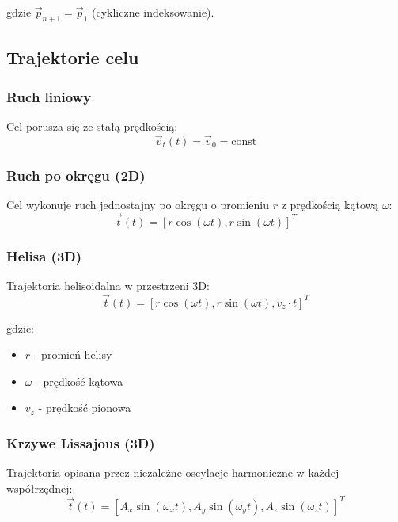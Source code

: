 \documentclass[12pt,a4paper]{article}
\begin{document}
gdzie $\vec{p}_{n+1} = \vec{p}_1$ (cykliczne indeksowanie).

\subsection{Trajektorie celu}

\subsubsection{Ruch liniowy}

Cel porusza się ze stałą prędkością:
\begin{equation}
\vec{v}_t(t) = \vec{v}_0 = \text{const}
\end{equation}

\subsubsection{Ruch po okręgu (2D)}

Cel wykonuje ruch jednostajny po okręgu o promieniu $r$ z prędkością kątową $\omega$:
\begin{equation}
\vec{t}(t) = [r\cos(\omega t), r\sin(\omega t)]^T
\end{equation}

\subsubsection{Helisa (3D)}

Trajektoria helisoidalna w przestrzeni 3D:
\begin{equation}
\vec{t}(t) = [r\cos(\omega t), r\sin(\omega t), v_z \cdot t]^T
\end{equation}

gdzie:
\begin{itemize}
    \item $r$ - promień helisy
    \item $\omega$ - prędkość kątowa
    \item $v_z$ - prędkość pionowa
\end{itemize}

\subsubsection{Krzywe Lissajous (3D)}

Trajektoria opisana przez niezależne oscylacje harmoniczne w każdej współrzędnej:
\begin{equation}
\vec{t}(t) = [A_x \sin(\omega_x t), A_y \sin(\omega_y t), A_z \sin(\omega_z t)]^T
\end{equation}
\end{document}
